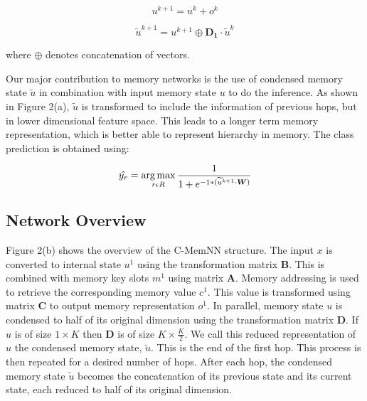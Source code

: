 \begin{itemize}
            \begin{equation}
                u^{k+1} = u^k + o^k 
            \end{equation}
    
            \begin{equation}
                \widetilde{u}^{k+1}    = u^{k+1} \oplus \boldsymbol{D_1} \cdot \widetilde{u}^k
            \end{equation}
    
            where $\oplus$ denotes concatenation of vectors. 
            
            Our major contribution to memory networks is the use of condensed memory state $\widetilde{u}$ in combination with input memory state $u$ to do the inference. As shown in Figure 2(a), $\widetilde{u}$ is transformed to include the information of previous hops, but in lower dimensional feature space. This leads to a longer term memory representation, which is better able to represent hierarchy in memory. The class prediction is obtained using: 
            
            
            \begin{equation}
                \hat{y_r} = \operatorname*{arg\,max}_{r \epsilon R} {\frac {1}{1+e^{-1 * (\widetilde{u}^{k+1} \cdot \boldsymbol{W})}}} \label{eq:probs}
            \end{equation}

     \end{itemize}
    
     \subsection{Network Overview}
            
            Figure 2(b) shows the overview of the C-MemNN structure. The input $x$ is converted to internal state $u^1$ using the transformation matrix $\boldsymbol{B}$. This is combined with memory key slots $m^1$ using matrix $\boldsymbol{A}$. Memory addressing is used to retrieve the corresponding memory value $c^1$. This value is transformed using matrix $\boldsymbol{C}$ to output memory representation $o^1$. In parallel, memory state $u$ is condensed to half of its original dimension using the transformation matrix $\boldsymbol{D}$. If $u$ is of size $1 \times K$ then $\boldsymbol{D}$ is of size $K \times \frac{K}{2}$. We call this reduced representation of $u$ the condensed memory state, $\widetilde{u}$. This is the end of the first hop. This process is then repeated for a desired number of hops. After each hop, the condensed memory state $\widetilde{u}$ becomes the concatenation of its previous state and its current state, each reduced to half of its original dimension. 
        
